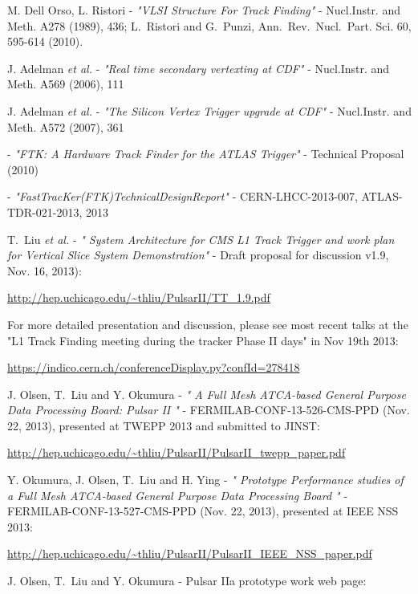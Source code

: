 \documentclass{cmspaper}
\begin{document}
\begin{thebibliography}{99}


 M. Dell Orso, L. Ristori - {\it "VLSI Structure For Track Finding"} - Nucl.Instr. and Meth. A278 (1989), 436; L.~Ristori and G.~Punzi, Ann.~Rev.~Nucl.~Part. Sci. 60, 595-614 (2010).

 J. Adelman {\it et al.} - {\it "Real time secondary vertexting at CDF"} - Nucl.Instr. and Meth. A569 (2006), 111

 J. Adelman {\it et al.} - {\it "The Silicon Vertex Trigger upgrade at CDF"} - Nucl.Instr. and Meth. A572 (2007), 361

  - {\it "FTK: A Hardware Track Finder for the ATLAS Trigger"} - Technical Proposal (2010)

  - {\it "FastTracKer(FTK)TechnicalDesignReport"} - CERN-LHCC-2013-007, ATLAS-TDR-021-2013, 2013


 T.~Liu {\it et al.} - {\it "
System Architecture for CMS L1 Track Trigger and work plan for Vertical Slice System
Demonstration"} - Draft proposal for discussion v1.9, Nov. 16, 2013):

\url{http://hep.uchicago.edu/~thliu/PulsarII/TT_1.9.pdf}

For more detailed presentation and discussion, please see most recent talks at the "L1 Track Finding meeting during the tracker Phase II days" in Nov 19th 2013:

\url{https://indico.cern.ch/conferenceDisplay.py?confId=278418}


 J. Olsen, T.~Liu and Y. Okumura - {\it "
A Full Mesh ATCA-based General Purpose Data Processing Board: Pulsar II
"} - FERMILAB-CONF-13-526-CMS-PPD (Nov. 22, 2013), presented at TWEPP 2013 and submitted to JINST:

\url{http://hep.uchicago.edu/~thliu/PulsarII/PulsarII_twepp_paper.pdf}

 Y. Okumura, J. Olsen, T.~Liu and H. Ying - {\it "
Prototype Performance studies of a Full Mesh ATCA-based General Purpose Data Processing Board
"} - FERMILAB-CONF-13-527-CMS-PPD (Nov. 22, 2013), presented at IEEE NSS 2013: 

\url{http://hep.uchicago.edu/~thliu/PulsarII/PulsarII_IEEE_NSS_paper.pdf}

 J. Olsen, T.~Liu and Y. Okumura - 
Pulsar IIa prototype work web page:


\end{thebibliography}
\end{document}
